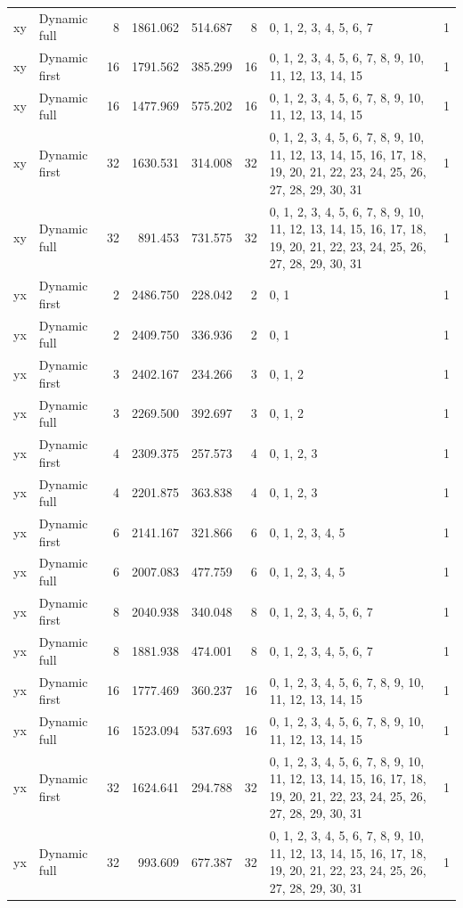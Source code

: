 \documentclass[10pt,a4paper]{article}
\begin{document}
\begin{longtable}{@{}p{23mm}p{29mm}rrrrp{36mm}r@{}}
xy & Dynamic full & 8 & 1861.062 & 514.687 & 8 & 0, 1, 2, 3, 4, 5, 6, 7 & 1 \\
xy & Dynamic first & 16 & 1791.562 & 385.299 & 16 & 0, 1, 2, 3, 4, 5, 6, 7, 8, 9, 10, 11, 12, 13, 14, 15 & 1 \\
xy & Dynamic full & 16 & 1477.969 & 575.202 & 16 & 0, 1, 2, 3, 4, 5, 6, 7, 8, 9, 10, 11, 12, 13, 14, 15 & 1 \\
xy & Dynamic first & 32 & 1630.531 & 314.008 & 32 & 0, 1, 2, 3, 4, 5, 6, 7, 8, 9, 10, 11, 12, 13, 14, 15, 16, 17, 18, 19, 20, 21, 22, 23, 24, 25, 26, 27, 28, 29, 30, 31 & 1 \\
xy & Dynamic full & 32 & 891.453 & 731.575 & 32 & 0, 1, 2, 3, 4, 5, 6, 7, 8, 9, 10, 11, 12, 13, 14, 15, 16, 17, 18, 19, 20, 21, 22, 23, 24, 25, 26, 27, 28, 29, 30, 31 & 1 \\
yx & Dynamic first & 2 & 2486.750 & 228.042 & 2 & 0, 1 & 1 \\
yx & Dynamic full & 2 & 2409.750 & 336.936 & 2 & 0, 1 & 1 \\
yx & Dynamic first & 3 & 2402.167 & 234.266 & 3 & 0, 1, 2 & 1 \\
yx & Dynamic full & 3 & 2269.500 & 392.697 & 3 & 0, 1, 2 & 1 \\
yx & Dynamic first & 4 & 2309.375 & 257.573 & 4 & 0, 1, 2, 3 & 1 \\
yx & Dynamic full & 4 & 2201.875 & 363.838 & 4 & 0, 1, 2, 3 & 1 \\
yx & Dynamic first & 6 & 2141.167 & 321.866 & 6 & 0, 1, 2, 3, 4, 5 & 1 \\
yx & Dynamic full & 6 & 2007.083 & 477.759 & 6 & 0, 1, 2, 3, 4, 5 & 1 \\
yx & Dynamic first & 8 & 2040.938 & 340.048 & 8 & 0, 1, 2, 3, 4, 5, 6, 7 & 1 \\
yx & Dynamic full & 8 & 1881.938 & 474.001 & 8 & 0, 1, 2, 3, 4, 5, 6, 7 & 1 \\
yx & Dynamic first & 16 & 1777.469 & 360.237 & 16 & 0, 1, 2, 3, 4, 5, 6, 7, 8, 9, 10, 11, 12, 13, 14, 15 & 1 \\
yx & Dynamic full & 16 & 1523.094 & 537.693 & 16 & 0, 1, 2, 3, 4, 5, 6, 7, 8, 9, 10, 11, 12, 13, 14, 15 & 1 \\
yx & Dynamic first & 32 & 1624.641 & 294.788 & 32 & 0, 1, 2, 3, 4, 5, 6, 7, 8, 9, 10, 11, 12, 13, 14, 15, 16, 17, 18, 19, 20, 21, 22, 23, 24, 25, 26, 27, 28, 29, 30, 31 & 1 \\
yx & Dynamic full & 32 & 993.609 & 677.387 & 32 & 0, 1, 2, 3, 4, 5, 6, 7, 8, 9, 10, 11, 12, 13, 14, 15, 16, 17, 18, 19, 20, 21, 22, 23, 24, 25, 26, 27, 28, 29, 30, 31 & 1 \\
\end{longtable}\normalsize\setlength{\tabcolsep}{6pt}
\clearpage
\end{document}
